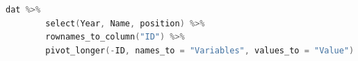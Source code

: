 \begin{lstlisting}[language=c++,label={code:usingR_pivot_longer2},caption={出力する変数名の指定}]
        dat %>%
        select(Year, Name, position) %>%
        rownames_to_column("ID") %>%
        pivot_longer(-ID, names_to = "Variables", values_to = "Value")
\end{lstlisting}
